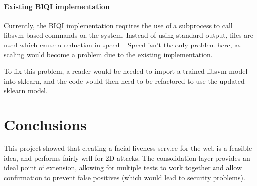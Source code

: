 \documentclass[10pt,a4paper]{article}
\begin{document}
    \paragraph{Existing BIQI implementation}
    Currently, the BIQI implementation requires the use of a subprocess to call libsvm based commands on the system. Instead of using standard output, files are used which
    cause a reduction in speed.
    .
    Speed isn't the only problem here, as scaling would become a problem due to the existing implementation. 

    To fix this problem, a reader would be needed to import a trained libsvm model into sklearn, and the code would then need to be refactored to use the updated sklearn model. 
\section{Conclusions}
    This project showed that creating a facial liveness service for the web is a feasible idea, and performs fairly well for 2D attacks. The consolidation layer provides
    an ideal point of extension, allowing for multiple tests to work together and allow confirmation to prevent false positives (which would lead to security problems).



\end{document}
